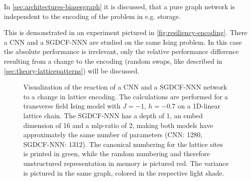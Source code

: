 In \autoref{sec:architectures-biasesgraph} it is discussed, that a pure graph network is independent to the encoding of the problem in e.g. storage.

This is demonstrated in an experiment pictured in \autoref{fig:resiliency-encoding}.
There a CNN and a SGDCF-NNN are studied on the same Ising problem.
In this case the absolute performance is irrelevant, only the relative performance difference resulting from a change to the encoding (random swaps, like described in \autoref{sec:theory-latticepatterns}) will be discussed. 

\begin{figure}[htbp]
    \centering
    \caption{
        Visualization of the reaction of a CNN and a SGDCF-NNN network to a change in lattice encoding.
        The calculations are performed for a transverse field Ising model with $J = -1$, $h=-0.7$ on a 1D-linear lattice chain.
        The SGDCF-NNN has a depth of 1, an embed dimension of 16 and a mlp-ratio of 2, making both models have approximately the same number of parameters (CNN: 1280, SGDCF-NNN: 1312).
        The canonical numbering for the lattice sites is printed in green, while the random numbering and therefore unstructured representation in memory is pictured red. 
        The variance is pictured in the same graph, colored in the respective light shade.
    }
    \label{fig:resiliency-encoding}
\end{figure}

